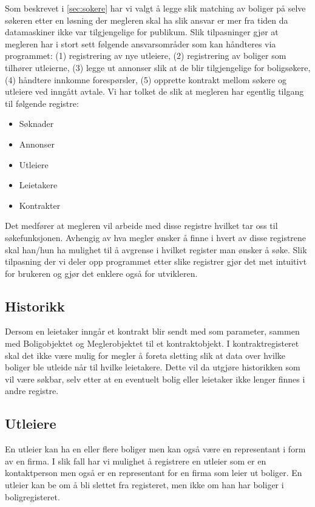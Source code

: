 Som beskrevet i \ref{sec:sokere} har vi valgt å legge slik matching av boliger på selve søkeren etter en løsning der megleren skal ha slik ansvar er mer fra tiden da datamaskiner ikke var tilgjengelige for publikum. Slik tilpasninger gjør at megleren har i stort sett følgende ansvarsområder som kan håndteres via programmet: (1) registrering av nye utleiere, (2) registrering av boliger som tilhører utleierne, (3) legge ut annonser slik at de blir tilgjengelige for boligsøkere, (4) håndtere innkomne forespørsler, (5) opprette kontrakt mellom søkere og utleiere ved inngått avtale. 
Vi har tolket de slik at megleren har egentlig tilgang til følgende registre:
\begin{itemize}
\item Søknader
\item Annonser
\item Utleiere
\item Leietakere
\item Kontrakter
\end{itemize}
Det medfører at megleren vil arbeide med disse registre hvilket tar oss til søkefunksjonen. Avhengig av hva megler ønsker å finne i hvert av disse registrene skal han/hun ha mulighet til å avgrense i hvilket register man ønsker å søke. Slik tilpasning der vi deler opp programmet etter slike registrer gjør det met intuitivt for brukeren og gjør det enklere også for utvikleren.

\subsection{Historikk}
Dersom en leietaker inngår et kontrakt blir sendt med som parameter, sammen med Boligobjektet og Meglerobjektet til et kontraktobjekt. I kontraktregisteret skal det ikke være mulig for megler å foreta sletting slik at data over hvilke boliger ble utleide når til hvilke leietakere. Dette vil da utgjøre historikken som vil være søkbar, selv etter at en eventuelt bolig eller leietaker ikke lenger finnes i andre registre.

\subsection{Utleiere}
En utleier kan ha en eller flere boliger men kan også være en representant i form av en firma. I slik fall har vi mulighet å registrere en utleier som er en kontaktperson men også er en representant for en firma som leier ut boliger. En utleier kan be om å bli slettet fra registeret, men ikke om han har boliger i boligregisteret. 

